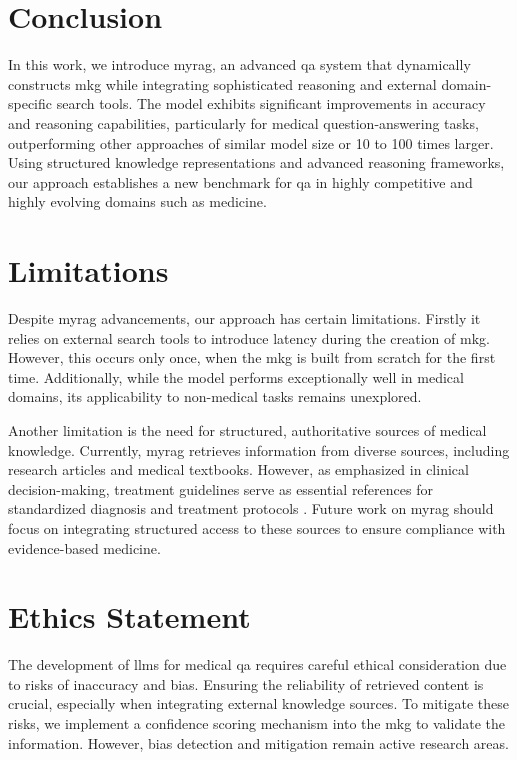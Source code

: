 \section{Conclusion}
In this work, we introduce \gls{myrag}, an advanced \gls{qa} system that dynamically constructs \gls{mkg} while integrating sophisticated reasoning and external domain-specific search tools. The model exhibits significant improvements in accuracy and reasoning capabilities, particularly for medical question-answering tasks, outperforming other approaches of similar model size or 10 to 100 times larger. Using structured knowledge representations and advanced reasoning frameworks, our approach establishes a new benchmark for \gls{qa} in highly competitive and highly evolving domains such as medicine.

\section{Limitations}

Despite \gls{myrag} advancements, our approach has certain limitations. Firstly it relies on external search tools to introduce latency during the creation of \gls{mkg}. However, this occurs only once, when the \gls{mkg} is built from scratch for the first time. Additionally, while the model performs exceptionally well in medical domains, its applicability to non-medical tasks remains unexplored. 


Another limitation is the need for structured, authoritative sources of medical knowledge. Currently, \gls{myrag} retrieves information from diverse sources, including research articles and medical textbooks. However, as emphasized in clinical decision-making, treatment guidelines serve as essential references for standardized diagnosis and treatment protocols \cite{hager2024evaluation}. Future work on \gls{myrag} should focus on integrating structured access to these sources to ensure compliance with evidence-based medicine.


\section{Ethics Statement}
The development of \gls{llm}s for medical \gls{qa} requires careful ethical consideration due to risks of inaccuracy and bias. Ensuring the reliability of retrieved content is crucial, especially when integrating external knowledge sources. To mitigate these risks, we implement a confidence scoring mechanism into the \gls{mkg} to validate the information. However, bias detection and mitigation remain active research areas.
